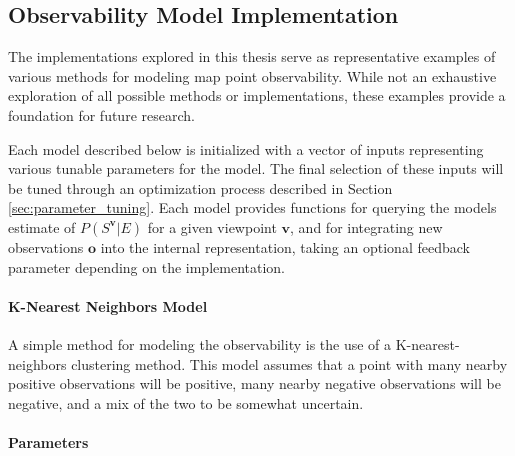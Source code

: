 \subsection{Observability Model Implementation}

The implementations explored in this thesis serve as representative examples of various methods for modeling map point observability. While not an exhaustive exploration of all possible methods or implementations, these examples provide a foundation for future research.

Each model described below is initialized with a vector of inputs representing various tunable parameters for the model. The final selection of these inputs will be tuned through an optimization process described in Section \ref{sec:parameter_tuning}. Each model provides functions for querying the models estimate of $P(S^{\boldsymbol{v}}|E)$ for a given viewpoint $\boldsymbol{v}$, and for integrating new observations $\boldsymbol{o}$ into the internal representation, taking an optional feedback parameter depending on the implementation.

\paragraph{K-Nearest Neighbors Model}

A simple method for modeling the observability is the use of a K-nearest-neighbors clustering method. This model assumes that a point with many nearby positive observations will be positive, many nearby negative observations will be negative, and a mix of the two to be somewhat uncertain.

\paragraph{Parameters}
\newline

\newline


